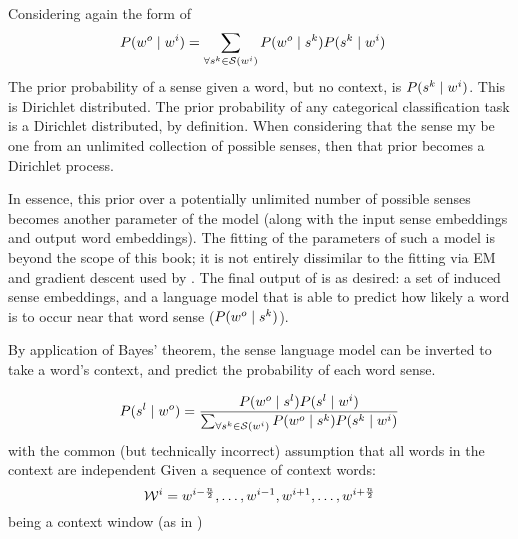 \documentclass[12pt,parskip]{komatufte}
\begin{document}
Considering again the form of 
\begin{align}
P(\n w_o\mid \n w_i) &= \sum_{\forall \n s_k \in \seq S(\n w_i)} P(\n w_o \mid \n s_k) P(\n s_k \mid \n w_i) 
\end{align}
The prior probability of a sense given a word, but no context, is 
$P(\n s_k \mid \n w_i)$.
This is Dirichlet distributed.
The prior probability of any categorical classification task is a Dirichlet distributed, by  definition.
When considering that the sense my be one from an unlimited collection of possible senses,
then that prior becomes a Dirichlet process.

In essence, this prior over a potentially unlimited number of possible senses becomes another parameter of the model (along with the input sense embeddings and output word embeddings).
The fitting of the parameters of such a model is beyond the scope of this book;
it is not entirely dissimilar to the fitting via EM and gradient descent used by  \textcite{tian2014probabilistic}.
The final output of \textcite{AdaGrams} is as desired:
a set of induced sense embeddings, 
and a language model that is able to predict how likely a word is to occur near that word sense ($P(\n w_o \mid \n s_k)$).

By application of Bayes' theorem, the sense language model can be inverted to take a word's context,
and predict the probability of each word sense.


\begin{equation}
P(\n s_l \mid \n w_o) = \frac{P(\n w_o \mid \n s_l) P(\n s_l \mid \n w_i)}{\sum_{\forall \n s_k \in \seq S(\n w_i)} P(\n w_o \mid \n s_k) P(\n s_k \mid \n w_i)} \label{equ:bayeswds}
\end{equation}
with the common (but technically incorrect) assumption that all words in the context are independent 
Given a sequence of context words:
\begin{equation}
\n \seq{W}_i = \n w_{i-\frac{n}{2}},\ldots, \n w_{i-1}, \n w_{i+1},\ldots, \n w_{i+\frac{n}{2}}
\end{equation}
being a context window (as in )
\end{document}
